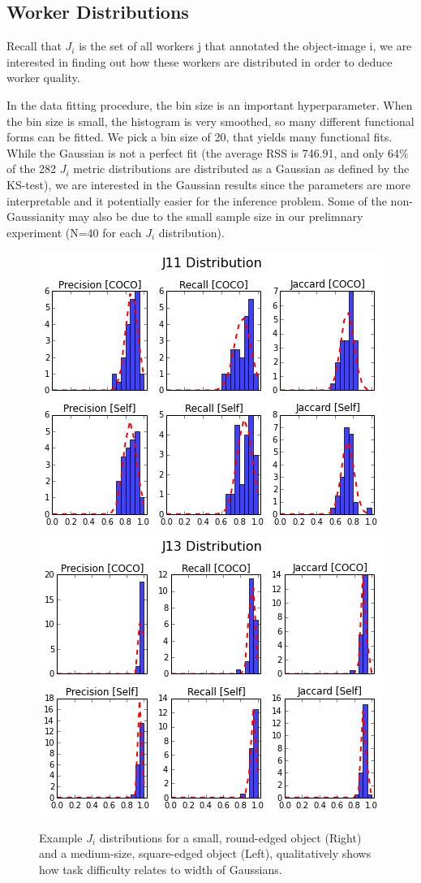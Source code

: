 \documentclass[12pt]{article}
\begin{document}
\subsection{Worker Distributions}
\par Recall that $J_i$  is the set of all workers j that annotated the object-image i, we are interested in finding out how these workers are distributed in order to deduce worker quality. 
\par In the data fitting procedure, the bin size is an important hyperparameter. When the bin size is small, the histogram is very smoothed, so many different functional forms can be fitted. We pick a bin size of 20, that yields many functional fits. While the Gaussian is not a perfect fit (the average RSS  is 746.91, and only 64\% of the 282 $J_i$ metric distributions are distributed as a Gaussian as defined by the KS-test), we are interested in the Gaussian results since the parameters are more interpretable and it potentially easier for the inference problem. Some of the non-Gaussianity may also be due to the small sample size in our prelimnary experiment (N=40 for each $J_i$ distribution).

\begin{figure}[ht]
\centering
\includegraphics[width=0.47\linewidth]{plots/J11Wide.png}
\includegraphics[width=0.47\linewidth]{plots/J13Narrow.png}
\caption{Example $J_i$ distributions for a small, round-edged object (Right) and a medium-size, square-edged object (Left), qualitatively shows how task difficulty relates to width of Gaussians.}
\end{figure}
\end{document}
